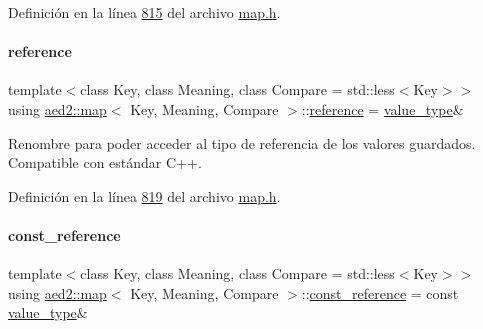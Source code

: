 Definición en la línea \hyperlink{map_8h_source_l00815}{815} del archivo \hyperlink{map_8h_source}{map.\+h}.

\mbox{\label{classaed2_1_1map_af4f147533b3c0207ab036c86ce13ec0d_af4f147533b3c0207ab036c86ce13ec0d}} 
\paragraph{\texorpdfstring{reference}{reference}}
{\footnotesize\ttfamily template$<$class Key, class Meaning, class Compare = std\+::less$<$\+Key$>$$>$ \\
using \hyperlink{classaed2_1_1map}{aed2\+::map}$<$ Key, Meaning, Compare $>$\+::\hyperlink{classaed2_1_1map_af4f147533b3c0207ab036c86ce13ec0d_af4f147533b3c0207ab036c86ce13ec0d}{reference} =  \hyperlink{classaed2_1_1map_a719db98e0ff9a837610f76be33264680_a719db98e0ff9a837610f76be33264680}{value\+\_\+type}\&}



Renombre para poder acceder al tipo de referencia de los valores guardados. Compatible con estándar C++. 



Definición en la línea \hyperlink{map_8h_source_l00819}{819} del archivo \hyperlink{map_8h_source}{map.\+h}.

\mbox{\label{classaed2_1_1map_a277080d3db76f19df9319ecba16475a9_a277080d3db76f19df9319ecba16475a9}} 
\paragraph{\texorpdfstring{const\+\_\+reference}{const\_reference}}
{\footnotesize\ttfamily template$<$class Key, class Meaning, class Compare = std\+::less$<$\+Key$>$$>$ \\
using \hyperlink{classaed2_1_1map}{aed2\+::map}$<$ Key, Meaning, Compare $>$\+::\hyperlink{classaed2_1_1map_a277080d3db76f19df9319ecba16475a9_a277080d3db76f19df9319ecba16475a9}{const\+\_\+reference} =  const \hyperlink{classaed2_1_1map_a719db98e0ff9a837610f76be33264680_a719db98e0ff9a837610f76be33264680}{value\+\_\+type}\&}



